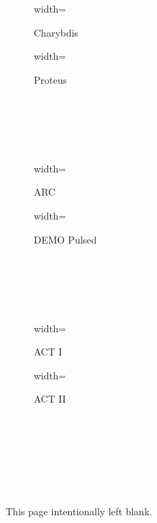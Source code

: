 \begin{figure*}[h!]
    \centering
    \hfill
    \begin{subfigure}[t]{0.45\textwidth}
        \centering
    \begin{adjustbox}{width=\textwidth}
      \Large
      
    \end{adjustbox}
        \caption{Charybdis}
    \end{subfigure}
    \hfill
    \begin{subfigure}[t]{0.45\textwidth}
        \centering
    \begin{adjustbox}{width=\textwidth}
      \Large
      
    \end{adjustbox}
        \caption{Proteus}
    \end{subfigure}
    \hfill \hfill ~\\ ~\\ ~\\ ~\\
    \hfill
    \begin{subfigure}[t]{0.45\textwidth}
        \centering
    \begin{adjustbox}{width=\textwidth}
      \Large
      
    \end{adjustbox}
        \caption{ARC}
    \end{subfigure}
    \hfill
    \begin{subfigure}[t]{0.45\textwidth}
        \centering
    \begin{adjustbox}{width=\textwidth}
      \Large
      
    \end{adjustbox}
        \caption{DEMO Pulsed}
    \end{subfigure}
    \hfill \hfill ~\\ ~\\ ~\\ ~\\
    \hfill
    \begin{subfigure}[t]{0.45\textwidth}
        \centering
    \begin{adjustbox}{width=\textwidth}
      \Large
      
    \end{adjustbox}
        \caption{ACT I}
    \end{subfigure}
    \hfill
    \begin{subfigure}[t]{0.45\textwidth}
        \centering
    \begin{adjustbox}{width=\textwidth}
      \Large
      
    \end{adjustbox}
        \caption{ACT II}
    \end{subfigure}
    \hfill \hfill ~\\ ~\\ ~\\ ~\\
  \caption[]{Cost Sensitivity: $({P_W})_{max}$ vs.\ $B_0$} ~\\
\end{figure*}

\newpage
\vspace*{\fill}
\begin{center}
This page intentionally left blank.
\end{center} ~
\vspace{\fill}



%
